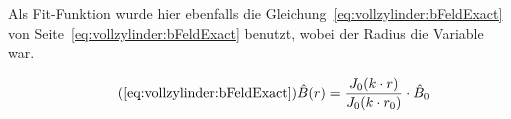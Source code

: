{\begin{minipage}[t]{0.33\textwidth}
\begin{minipage}[t]{0.5\textwidth}
            Als        Fit-Funktion         wurde        hier        ebenfalls
            die         Gleichung~\ref{eq:vollzylinder:bFeldExact}         von
            Seite~\ref{eq:vollzylinder:bFeldExact}  benutzt, wobei  der Radius
            die Variable war.



            \begin{equation}
                \tag{\ref{eq:vollzylinder:bFeldExact}}
                \hat{B} (r) = \frac{J_0 (k \cdot r)}{J_0 (k \cdot r_0)} \cdot \hat{B}_0
            \end{equation}


            \vspace{0.5em}

        \end{minipage}


\end{minipage}}
